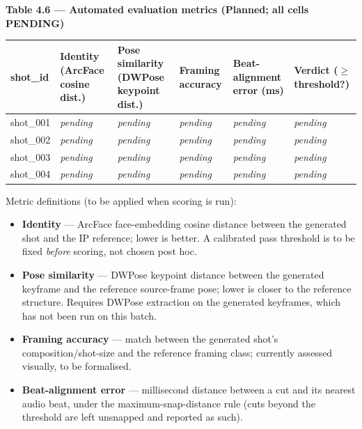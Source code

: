 \documentclass[10pt,twocolumn,letterpaper]{article}
\begin{document}
\begin{table}[t]
\centering
{\footnotesize\textbf{\textbf{Table 4.6 --- Automated evaluation metrics (Planned; all cells PENDING)}}}\par\vspace{3pt}
\scriptsize
\begin{tabularx}{\textwidth}{l>{\RaggedRight\arraybackslash}X>{\RaggedRight\arraybackslash}X>{\RaggedRight\arraybackslash}X>{\RaggedRight\arraybackslash}X>{\RaggedRight\arraybackslash}X}
\toprule
shot\_id & Identity (ArcFace cosine dist.) & Pose similarity (DWPose keypoint dist.) & Framing accuracy & Beat-alignment error (ms) & Verdict ($\ge$ threshold?) \\
\midrule
shot\_001 & \emph{pending} & \emph{pending} & \emph{pending} & \emph{pending} & \emph{pending} \\
shot\_002 & \emph{pending} & \emph{pending} & \emph{pending} & \emph{pending} & \emph{pending} \\
shot\_003 & \emph{pending} & \emph{pending} & \emph{pending} & \emph{pending} & \emph{pending} \\
shot\_004 & \emph{pending} & \emph{pending} & \emph{pending} & \emph{pending} & \emph{pending} \\
\bottomrule
\end{tabularx}
\end{table}

Metric definitions (to be applied when scoring is run):

\begin{itemize}[leftmargin=1.2em,itemsep=1pt,topsep=2pt]

\item \textbf{Identity} --- ArcFace face-embedding cosine distance between the generated shot and the IP reference; lower is better. A calibrated pass threshold is to be fixed \emph{before} scoring, not chosen post hoc.

\item \textbf{Pose similarity} --- DWPose keypoint distance between the generated keyframe and the reference source-frame pose; lower is closer to the reference structure. Requires DWPose extraction on the generated keyframes, which has not been run on this batch.

\item \textbf{Framing accuracy} --- match between the generated shot's composition/shot-size and the reference framing class; currently assessed visually, to be formalised.

\item \textbf{Beat-alignment error} --- millisecond distance between a cut and its nearest audio beat, under the maximum-snap-distance rule (cuts beyond the threshold are left unsnapped and reported as such).

\end{itemize}
\end{document}

